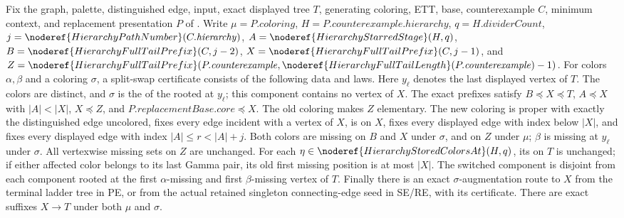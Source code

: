 \begin{definition}
Fix the graph, palette, distinguished edge, input, exact displayed tree
\(T\), generating coloring, ETT, base, counterexample \(C\), minimum
context, and replacement presentation \(P\) of
. Write \(\mu=P.\mathit{coloring}\),
\(H=P.\mathit{counterexample.hierarchy}\), \(q=H.\mathit{dividerCount}\),
\(j=\noderef{HierarchyPathNumber}(C.\mathit{hierarchy})\),
\(A=\noderef{HierarchyStarredStage}(H,q)\),
\(B=\noderef{HierarchyFullTailPrefix}(C,j-2)\),
\(X=\noderef{HierarchyFullTailPrefix}(C,j-1)\), and
\(Z=\noderef{HierarchyFullTailPrefix}(P.\mathit{counterexample},
\noderef{HierarchyFullTailLength}(P.\mathit{counterexample})-1)\).
For colors \(\alpha,\beta\) and a coloring \(\sigma\), a split-swap
certificate consists of the following data and laws. Here \(y_\ell\)
denotes the last displayed vertex of \(T\).
The colors are distinct, and \(\sigma\) is the
 of the
 rooted at \(y_\ell\); this component
contains no vertex of \(X\). The exact prefixes satisfy
\(B\preccurlyeq X\preccurlyeq T\), \(A\preccurlyeq X\) with
\(|A|<|X|\), \(X\preccurlyeq Z\), and
\(P.\mathit{replacementBase.core}\preccurlyeq X\).
The old coloring makes \(Z\) elementary. The new coloring is proper
with exactly the distinguished edge uncolored, fixes every edge incident
with a vertex of \(X\), is
 on \(X\), fixes every displayed edge
with index below \(|X|\), and fixes every displayed edge with index
\(|A|\le r<|A|+j\).
Both colors are missing on \(B\) and \(X\) under \(\sigma\), and
on \(Z\) under \(\mu\); \(\beta\) is missing at \(y_\ell\)
under \(\sigma\). All vertexwise missing sets on \(Z\) are unchanged.
For each \(\eta\in\noderef{HierarchyStoredColorsAt}(H,q)\), its
 on \(T\) is unchanged; if
either affected color belongs to its last Gamma pair, its old first
missing position is at most \(|X|\).
The switched component is disjoint from each component rooted at the
first \(\alpha\)-missing and first \(\beta\)-missing vertex of \(T\).
Finally there is an exact \(\sigma\)-augmentation route to \(X\)
from the terminal ladder tree in PE, or from the actual retained
singleton connecting-edge seed in SE/RE, with its
 certificate. There are exact
 suffixes \(X\to T\) under
both \(\mu\) and \(\sigma\).
\end{definition}
